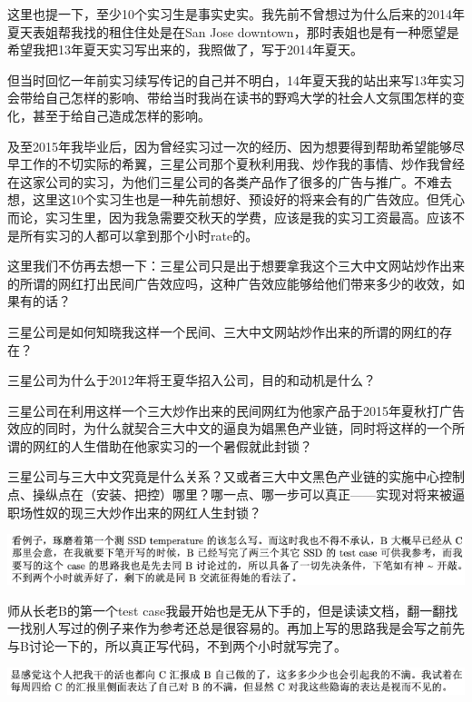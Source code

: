 \documentclass[9pt, b5paper]{article}
\begin{document}
这里也提一下，至少10个实习生是事实史实。我先前不曾想过为什么后来的2014年夏天表姐帮我找的租住住处是在San Jose downtown，那时表姐也是有一种愿望是希望我把13年夏天实习写出来的，我照做了，写于2014年夏天。

但当时回忆一年前实习续写传记的自己并不明白，14年夏天我的站出来写13年实习会带给自己怎样的影响、带给当时我尚在读书的野鸡大学的社会人文氛围怎样的变化，甚至于给自己造成怎样的影响。

及至2015年我毕业后，因为曾经实习过一次的经历、因为想要得到帮助希望能够尽早工作的不切实际的希翼，三星公司那个夏秋利用我、炒作我的事情、炒作我曾经在这家公司的实习，为他们三星公司的各类产品作了很多的广告与推广。不难去想，这里这10个实习生也是一种先前想好、预设好的将来会有的广告效应。但凭心而论，实习生里，因为我急需要交秋天的学费，应该是我的实习工资最高。应该不是所有实习的人都可以拿到那个小时rate的。

这里我们不仿再去想一下：三星公司只是出于想要拿我这个三大中文网站炒作出来的所谓的网红打出民间广告效应吗，这种广告效应能够给他们带来多少的收效，如果有的话？

三星公司是如何知晓我这样一个民间、三大中文网站炒作出来的所谓的网红的存在？

三星公司为什么于2012年将王夏华招入公司，目的和动机是什么？

三星公司在利用这样一个三大炒作出来的民间网红为他家产品于2015年夏秋打广告效应的同时，为什么就契合三大中文的逼良为娼黑色产业链，同时将这样的一个所谓的网红的人生借助在他家实习的一个暑假就此封锁？

三星公司与三大中文究竟是什么关系？又或者三大中文黑色产业链的实施中心控制点、操纵点在（安装、把控）哪里？哪一点、哪一步可以真正——实现对将来被逼职场性奴的现三大炒作出来的网红人生封锁？

\begin{center}
\includegraphics[width=.9\linewidth]{./pic/backups_plans_20210504_215646.png}
\end{center}

师从长老B的第一个test case我最开始也是无从下手的，但是读读文档，翻一翻找一找别人写过的例子来作为参考还总是很容易的。再加上写的思路我是会写之前先与B讨论一下的，所以真正写代码，不到两个小时就写完了。 

\begin{center}
\includegraphics[width=.9\linewidth]{./pic/backups_plans_20210504_231201.png}
\end{center}
\end{document}
